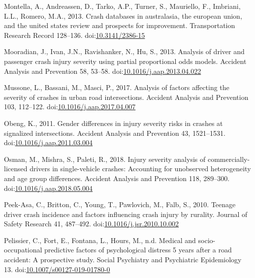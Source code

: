 \documentclass[]{elsarticle} %
\begin{document}
\leavevmode\hypertarget{ref-Montella2013crash}{}%
Montella, A., Andreassen, D., Tarko, A.P., Turner, S., Mauriello, F.,
Imbriani, L.L., Romero, M.A., 2013. Crash databases in australasia, the
european union, and the united states review and prospects for
improvement. Transportation Research Record 128--136.
doi:\href{https://doi.org/10.3141/2386-15}{10.3141/2386-15}

\leavevmode\hypertarget{ref-Mooradian2013analysis}{}%
Mooradian, J., Ivan, J.N., Ravishanker, N., Hu, S., 2013. Analysis of
driver and passenger crash injury severity using partial proportional
odds models. Accident Analysis and Prevention 58, 53--58.
doi:\href{https://doi.org/10.1016/j.aap.2013.04.022}{10.1016/j.aap.2013.04.022}

\leavevmode\hypertarget{ref-Mussone2017analysis}{}%
Mussone, L., Bassani, M., Masci, P., 2017. Analysis of factors affecting
the severity of crashes in urban road intersections. Accident Analysis
and Prevention 103, 112--122.
doi:\href{https://doi.org/10.1016/j.aap.2017.04.007}{10.1016/j.aap.2017.04.007}

\leavevmode\hypertarget{ref-Obeng2011gender}{}%
Obeng, K., 2011. Gender differences in injury severity risks in crashes
at signalized intersections. Accident Analysis and Prevention 43,
1521--1531.
doi:\href{https://doi.org/10.1016/j.aap.2011.03.004}{10.1016/j.aap.2011.03.004}

\leavevmode\hypertarget{ref-Osman2018injury}{}%
Osman, M., Mishra, S., Paleti, R., 2018. Injury severity analysis of
commercially-licensed drivers in single-vehicle crashes: Accounting for
unobserved heterogeneity and age group differences. Accident Analysis
and Prevention 118, 289--300.
doi:\href{https://doi.org/10.1016/j.aap.2018.05.004}{10.1016/j.aap.2018.05.004}

\leavevmode\hypertarget{ref-Peek-Asa2010teenage}{}%
Peek-Asa, C., Britton, C., Young, T., Pawlovich, M., Falb, S., 2010.
Teenage driver crash incidence and factors influencing crash injury by
rurality. Journal of Safety Research 41, 487--492.
doi:\href{https://doi.org/10.1016/j.jsr.2010.10.002}{10.1016/j.jsr.2010.10.002}

\leavevmode\hypertarget{ref-Pelissier2019medical}{}%
Pelissier, C., Fort, E., Fontana, L., Hours, M., n.d. Medical and
socio-occupational predictive factors of psychological distress 5 years
after a road accident: A prospective study. Social Psychiatry and
Psychiatric Epidemiology 13.
doi:\href{https://doi.org/10.1007/s00127-019-01780-0}{10.1007/s00127-019-01780-0}
\end{document}

